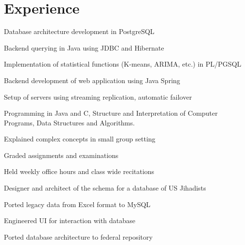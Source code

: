 \documentclass[]{deedy-resume-openfont}
\begin{document}
\begin{minipage}[t]{0.66\textwidth} 


\section{Experience}

\vspace{\topsep} %
\begin{tightemize}\item Database architecture development in PostgreSQL
\item Backend querying in Java using JDBC and Hibernate
\item Implementation of statistical functions (K-means, ARIMA, etc.) in PL/PGSQL
\item Backend development of web application using Java Spring
\item Setup of servers using streaming replication, automatic failover
\end{tightemize}
\sectionsep

\begin{tightemize}
\item Programming in Java and C, Structure and Interpretation of Computer Programs, Data Structures and Algorithms.
\item Explained complex concepts in small group setting
\item Graded assignments and examinations
\item Held weekly office hours and class wide recitations
\end{tightemize}
\sectionsep

\begin{tightemize}
\item Designer and architect of the schema for a database of US Jihadists
\item Ported legacy data from Excel format to MySQL
\item Engineered UI for interaction with database
\item Ported database architecture to federal repository
\end{tightemize}
\sectionsep


\end{minipage}
\end{document}
